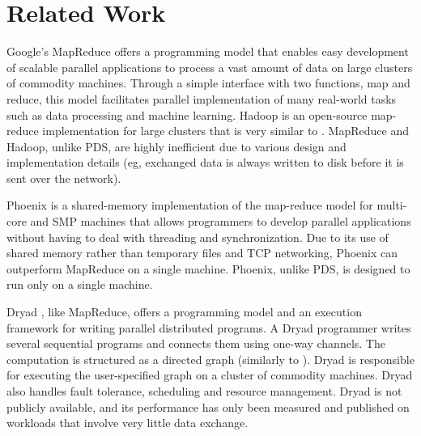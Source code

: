 \documentclass{acm_proc_article-sp}
\begin{document}


\section{Related Work}
Google's MapReduce \cite{mapreduce} offers a programming model that enables easy development of scalable parallel applications to process a vast amount of data on large clusters of commodity machines. Through a simple interface with two functions, map and reduce, this model facilitates parallel implementation of many real-world tasks such as data processing and machine learning. Hadoop \cite{hadoop} is an open-source map-reduce implementation for large clusters that is very similar to \cite{mapreduce}. MapReduce and Hadoop, unlike PDS, are highly inefficient due to various design and implementation details (eg, exchanged data is always written to disk before it is sent over the network).

Phoenix \cite{phoenix} is a shared-memory implementation of the map-reduce model for multi-core and SMP machines that allows programmers to develop parallel applications without having to deal with threading and synchronization. Due to its use of shared memory rather than temporary files and TCP networking, Phoenix can  outperform MapReduce on a single machine. Phoenix, unlike PDS, is designed to run only on a single machine.

Dryad \cite{dryad}, like MapReduce, offers a programming model and an execution framework for writing parallel distributed programs. A Dryad programmer writes several sequential programs and connects them using one-way channels. The computation is structured as a directed graph (similarly to \cite{paralleldatabases}). Dryad is responsible for executing the user-specified graph on a cluster of commodity machines. Dryad also handles fault tolerance, scheduling and resource management. Dryad is not publicly available, and its performance has only been measured and published on workloads that involve very little data exchange.
\end{document}
